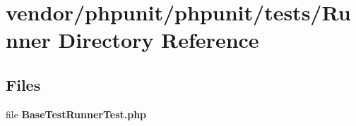 \section{vendor/phpunit/phpunit/tests/\+Runner Directory Reference}
\label{dir_653dcd86c7ef72d370ac696101fa69ca}
\subsection*{Files}
\begin{DoxyCompactItemize}
\item 
file {\bf Base\+Test\+Runner\+Test.\+php}
\end{DoxyCompactItemize}
